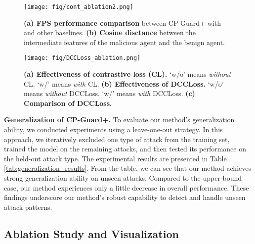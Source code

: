 \begin{figure}[t]
    \centering
    \texttt{[image: fig/cont\_ablation2.png]}
    \vspace{-9mm}
    \caption{\textbf{(a) FPS performance comparison} between CP-Guard+ with and other baselines. \textbf{(b) Cosine disctance} between the intermediate features of the malicious agent and the benign agent. 
    }
    \label{fig:cont_ablation}
    \vspace{-5mm}
\end{figure}

\begin{figure}[t]
    \centering
    \texttt{[image: fig/DCCLoss\_ablation.png]}
    \vspace{-9mm}
    \caption{\textbf{(a) Effectiveness of contrastive loss (CL).} `w/o' means \textit{without} CL. `w/' means \textit{with} CL.  \textbf{(b) Effectiveness of DCCLoss.} `w/o' means \textit{without} DCCLoss. `w/' means \textit{with} DCCLoss. \textbf{(c) Comparison of DCCLoss.}
    }
    \label{fig:dccloss_ablation}
    \vspace{-7mm}
\end{figure}

\textbf{Generalization of CP-Guard+.} To evaluate our method's generalization ability, we conducted experiments using a leave-one-out strategy. In this approach, we iteratively excluded one type of attack from the training set, trained the model on the remaining attacks, and then tested its performance on the held-out attack type. The experimental results are presented in Table \ref{tab:generalization_results}. From the table, we can see that our method achieves strong generalization ability on unseen attacks. Compared to the upper-bound case, our method experiences only a little decrease in overall performance. These findings underscore our method's robust capability to detect and handle unseen attack patterns. 

\vspace{-2mm}

\subsection{Ablation Study and Visualization}


